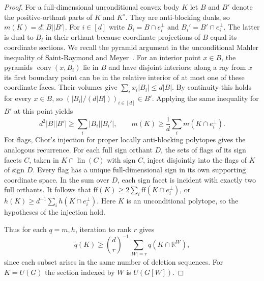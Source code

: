 \documentclass[11pt,a4paper]{article}
\numberwithin{equation}{section}
\begin{document}
\begin{proof}
For a full-dimensional unconditional convex body $K$ let $B$ and $B'$ denote the positive-orthant parts of $K$ and $K^\circ$. They are anti-blocking duals, so $m(K)=d!|B||B'|$. For $i\in[d]$ write $B_i=B\cap e_i^\perp$ and $B_i'=B'\cap e_i^\perp$. The latter is dual to $B_i$ in their orthant because coordinate projections of $B$ equal its coordinate sections. We recall the pyramid argument in the unconditional Mahler inequality of Saint-Raymond and Meyer~\cite{Meyer}. For an interior point $x\in B$, the pyramids $\operatorname{conv}(x,B_i)$ lie in $B$ and have disjoint interiors: along a ray from $x$ its first boundary point can be in the relative interior of at most one of these coordinate faces. Their volumes give $\sum_i x_i|B_i|\le d|B|$. By continuity this holds for every $x\in B$, so $(|B_i|/(d|B|))_{i\in[d]}\in B'$. Applying the same inequality for $B'$ at this point yields
\[
 d^2|B||B'|\ge\sum_i|B_i||B_i'|,\qquad
 m(K)\ge\frac1d\sum_i m(K\cap e_i^\perp).
\]
For flags, Chor's injection for proper locally anti-blocking polytopes \cite[Lemma~3.3(i)]{Chor} gives the analogous recurrence. For each full sign orthant $D$, the sets of flags of its sign facets $C$, taken in $K\cap\operatorname{lin}(C)$ with sign $C$, inject disjointly into the flags of $K$ of sign $D$. Every flag has a unique full-dimensional sign in its own supporting coordinate space. In the sum over $D$, each sign facet is incident with exactly two full orthants. It follows that $\mathrm{ff}(K)\ge2\sum_i\mathrm{ff}(K\cap e_i^\perp)$, or $h(K)\ge d^{-1}\sum_i h(K\cap e_i^\perp)$. Here $K$ is an unconditional polytope, so the hypotheses of the injection hold.

Thus for each $q=m,h$, iteration to rank $r$ gives
\[
 q(K)\ge\binom dr^{-1}\sum_{|W|=r}q(K\cap\mathbb R^W),
\]
since each subset arises in the same number of deletion sequences. For $K=U(G)$ the section indexed by $W$ is $U(G[W])$.


\end{proof}
\end{document}
